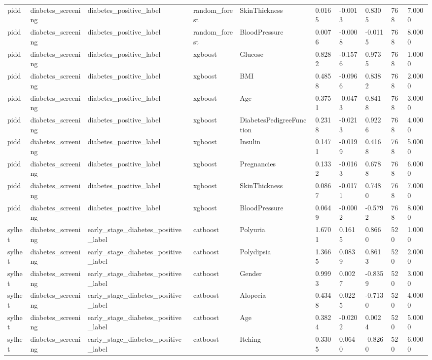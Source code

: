 \begin{tabular}{llllllllll}
pidd & diabetes\_screening & diabetes\_positive\_label & random\_forest & SkinThickness & 0.0165 & -0.0013 & 0.8305 & 768 & 7.0000 \\
pidd & diabetes\_screening & diabetes\_positive\_label & random\_forest & BloodPressure & 0.0076 & -0.0008 & -0.0115 & 768 & 8.0000 \\
pidd & diabetes\_screening & diabetes\_positive\_label & xgboost & Glucose & 0.8282 & -0.1576 & 0.9735 & 768 & 1.0000 \\
pidd & diabetes\_screening & diabetes\_positive\_label & xgboost & BMI & 0.4858 & -0.0966 & 0.8382 & 768 & 2.0000 \\
pidd & diabetes\_screening & diabetes\_positive\_label & xgboost & Age & 0.3751 & -0.0473 & 0.8418 & 768 & 3.0000 \\
pidd & diabetes\_screening & diabetes\_positive\_label & xgboost & DiabetesPedigreeFunction & 0.2318 & -0.0213 & 0.9226 & 768 & 4.0000 \\
pidd & diabetes\_screening & diabetes\_positive\_label & xgboost & Insulin & 0.1471 & -0.0199 & 0.4168 & 768 & 5.0000 \\
pidd & diabetes\_screening & diabetes\_positive\_label & xgboost & Pregnancies & 0.1332 & -0.0163 & 0.6788 & 768 & 6.0000 \\
pidd & diabetes\_screening & diabetes\_positive\_label & xgboost & SkinThickness & 0.0867 & -0.0171 & 0.7480 & 768 & 7.0000 \\
pidd & diabetes\_screening & diabetes\_positive\_label & xgboost & BloodPressure & 0.0649 & -0.0002 & -0.5792 & 768 & 8.0000 \\
sylhet & diabetes\_screening & early\_stage\_diabetes\_positive\_label & catboost & Polyuria & 1.6701 & 0.1615 & 0.8660 & 520 & 1.0000 \\
sylhet & diabetes\_screening & early\_stage\_diabetes\_positive\_label & catboost & Polydipsia & 1.3665 & 0.0839 & 0.8613 & 520 & 2.0000 \\
sylhet & diabetes\_screening & early\_stage\_diabetes\_positive\_label & catboost & Gender & 0.9993 & 0.0027 & -0.8359 & 520 & 3.0000 \\
sylhet & diabetes\_screening & early\_stage\_diabetes\_positive\_label & catboost & Alopecia & 0.4348 & 0.0225 & -0.7130 & 520 & 4.0000 \\
sylhet & diabetes\_screening & early\_stage\_diabetes\_positive\_label & catboost & Age & 0.3824 & -0.0202 & 0.0024 & 520 & 5.0000 \\
sylhet & diabetes\_screening & early\_stage\_diabetes\_positive\_label & catboost & Itching & 0.3305 & 0.0640 & -0.8260 & 520 & 6.0000 \\

\end{tabular}
